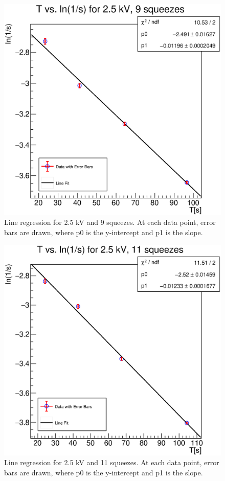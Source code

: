 \documentclass[reprint,amsmath,aps,nofootinbib,english]{revtex4-2}
\begin{document}
\begin{figure}[H]
  \includegraphics[width=0.95\columnwidth]{graphics/25_9.eps}
  \caption{Line regression for 2.5 kV and 9 squeezes. At each data point, error bars are drawn, where p0 is the y-intercept and p1 is the slope.}
\end{figure}




\begin{figure}[H]
  \includegraphics[width=0.95\columnwidth]{graphics/25_11.eps}
  \caption{Line regression for 2.5 kV and 11 squeezes. At each data point, error bars are drawn, where p0 is the y-intercept and p1 is the slope.}
\end{figure}
\end{document}
